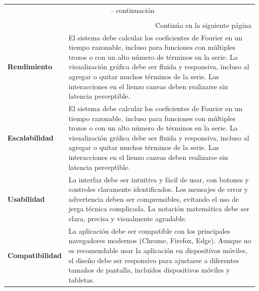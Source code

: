 \begin{longtable}{|m{5cm}|m{8.5cm}|}
	\hline
	\rowcolor{black!75}
	\head {Nombre} & \head {Descripción} \\ \hline
	\endfirsthead
	\multicolumn{2}{c}{{\tablename\ \thetable{} -- continuación}} \\
	\rowcolor{black!75}
	\head {Nombre} & \head {Descripción}\\ \hline
	\endhead
	\hline \multicolumn{2}{r}{{Continúa en la siguiente página}} \\
	\endfoot
	\hline
	\endlastfoot
	\textbf{Rendimiento} & El sistema debe calcular los coeficientes de Fourier en un tiempo razonable, incluso para funciones con múltiples trozos o con un alto número de términos en la serie. La visualización gráfica debe ser fluida y responsiva, incluso al agregar o quitar muchos términos de la serie. Las interacciones en el lienzo canvas deben realizarse sin latencia perceptible. \\
	\hline
	
	\textbf{Escalabilidad} & El sistema debe calcular los coeficientes de Fourier en un tiempo razonable, incluso para funciones con múltiples trozos o con un alto número de términos en la serie. La visualización gráfica debe ser fluida y responsiva, incluso al agregar o quitar muchos términos de la serie. Las interacciones en el lienzo canvas deben realizarse sin latencia perceptible. \\
	\hline
	
	\textbf{Usabilidad} & La interfaz debe ser intuitiva y fácil de usar, con botones y controles claramente identificados. Los mensajes de error y advertencia deben ser comprensibles, evitando el uso de jerga técnica complicada. La notación matemática debe ser clara, precisa y visualmente agradable. \\
	\hline
	
	\textbf{Compatibilidad} & La aplicación debe ser compatible con los principales navegadores modernos (Chrome, Firefox, Edge). Aunque no es recomendable usar la aplicación en dispositivos móviles, el diseño debe ser responsivo para ajustarse a diferentes tamaños de pantalla, incluidos dispositivos móviles y tabletas. \\
	\hline
	
	

\end{longtable}
